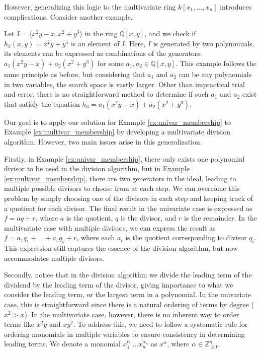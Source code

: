 However, generalizing this logic to the multivariate ring $k[x_1, \dots, x_n]$ introduces complications. Consider another example.

\begin{example} 
\label{ex:multivar_membership}
Let $I = \langle x^2 y - x, x^2 + y^3 \rangle$ in the ring $\mathbb{Q}[x, y]$, and we check if $h_3(x, y) = x^2y + y^4$ is an element of $I$. Here, $I$ is generated by two polynomials, its elements can be expressed as combinations of the generators: $a_1(x^2 y - x) + a_2(x^2 + y^3)$ for some $a_1, a_2 \in \mathbb{Q}[x, y]$. This example follows the same principle as before, but considering that $a_1$ and $a_2$ can be any polynomials in two variables, the search space is vastly larger. Other than impractical trial and error, there is no straightforward method to determine if such $a_1$ and $a_2$ exist that satisfy the equation $h_3 = a_1(x^2 y - x) + a_2(x^2 + y^3)$.
\end{example}

Our goal is to apply our solution for Example \ref{ex:univar_membership} to Example \ref{ex:multivar_membership} by developing a multivariate division algorithm. However, two main issues arise in this generalization.

Firstly, in Example \ref{ex:univar_membership}, there only exists one polynomial divisor to be used in the division algorithm, but in Example \ref{ex:multivar_membership}, there are two generators in the ideal, leading to multiple possible divisors to choose from at each step. We can overcome this problem by simply choosing one of the divisors in each step and keeping track of a quotient for each divisor. The final result in the univariate case is expressed as $f = aq + r$, where $a$ is the quotient, $q$ is the divisor, and $r$ is the remainder. In the multivariate case with multiple divisors, we can express the result as $f = a_1 q_1 + \dots + a_s q_s + r$, where each $a_i$ is the quotient corresponding to divisor $q_i$. This expression still captures the essence of the division algorithm, but now accommodates multiple divisors.

Secondly, notice that in the division algorithm we divide the leading term of the dividend by the leading term of the divisor, giving importance to what we consider the leading term, or the largest term in a polynomial. In the univariate case, this is straightforward since there is a natural ordering of terms by degree ($x^2 > x$). In the multivariate case, however, there is no inherent way to order terms like $x^2 y$ and $x y^2$. To address this, we need to follow a systematic rule for ordering monomials in multiple variables to ensure consistency in determining leading terms. We denote a monomial $x_1^{\alpha_1} \dots x_n^{\alpha_n}$ as $x^\alpha$, where $\alpha \in \mathbb{Z}_{\ge 0}^n$.

